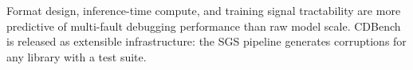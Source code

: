 \documentclass[12pt]{article}
\begin{document}
Format design, inference-time compute, and training signal tractability are more
predictive of multi-fault debugging performance than raw model scale. CDBench is
released as extensible infrastructure: the SGS pipeline generates corruptions
for any library with a test suite.





\end{document}
